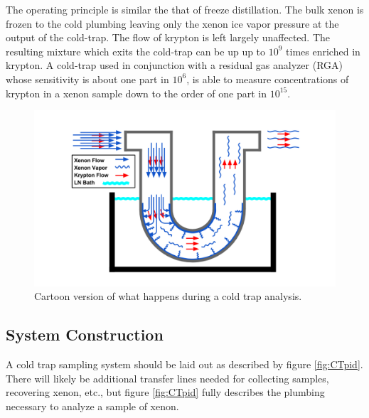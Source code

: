 The operating principle is similar the that of freeze distillation. The bulk xenon is frozen to the cold plumbing leaving only the xenon ice vapor pressure at the output of the cold-trap. The flow of krypton is left largely unaffected. The resulting mixture which exits the cold-trap can be up up to $10^9$ times enriched in krypton. A cold-trap used in conjunction with a residual gas analyzer (RGA) whose sensitivity is about one part in $10^6$, is able to measure concentrations of krypton in a xenon sample down to the order of one part in $10^{15}$.
\begin{figure}[h]
  \includegraphics[width=\linewidth]{Figures/Cold_Trap_cartoon.png}
  \caption{Cartoon version of what happens during a cold trap analysis. }
  \label{fig:CTcartoon}
\end{figure}

\subsection{System Construction}
A cold trap sampling system should be laid out as described by figure \ref{fig:CTpid}. There will likely be additional transfer lines needed for collecting samples, recovering xenon, etc., but figure \ref{fig:CTpid} fully describes the plumbing necessary to analyze a sample of xenon.

